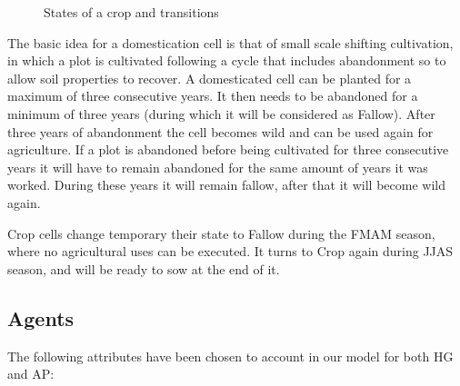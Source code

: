 \begin{figure}[h]
\centering
\setlength\fboxsep{0pt}
\setlength\fboxrule{0.5pt}
\caption{States of a crop and transitions}
\label{fig:cropStates}
\end{figure}


The basic idea for a domestication cell is that of small scale shifting cultivation, in which a plot is
cultivated following a cycle that includes abandonment so to allow soil properties to recover. A
domesticated cell can be planted for a maximum of three consecutive years. It then needs to be
abandoned for a minimum of three years (during which it will be considered as Fallow). After three
years of abandonment the cell becomes wild and can be used again for agriculture. If a plot is
abandoned before being cultivated for three consecutive years it will have to remain abandoned for
the same amount of years it was worked. During these years it will remain fallow, after that it will
become wild again.

Crop cells change temporary their state to Fallow during the FMAM season, where no agricultural
uses can be executed. It turns to Crop again during JJAS season, and will be ready to sow at the end
of it.



\subsection{Agents}
The following attributes have been chosen to account in our model for both HG and AP:

